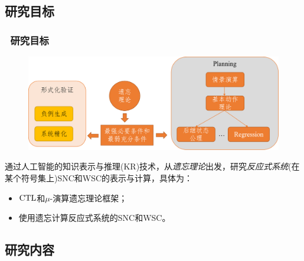 \documentclass[9pt, CJK]{beamer}
\begin{document}
	\subsection{研究目标}
	\begin{frame}
		\frametitle{~研究目标}
		\begin{figure}
			\includegraphics[scale=0.3]{figures/mubiao}
		\end{figure}
		{\footnotesize
			通过人工智能的知识表示与推理(KR)技术，从{\em 遗忘理论}出发，研究{\em 反应式系统}(在某个符号集上)SNC和WSC的表示与计算，具体为：
			\begin{itemize}
				\item $\textrm{CTL}$和$\mu$-演算遗忘理论框架；
				\item 使用遗忘计算反应式系统的SNC和WSC。
			\end{itemize}
		}
	\end{frame}
	
	
	\subsection{研究内容}
	
\end{document}
